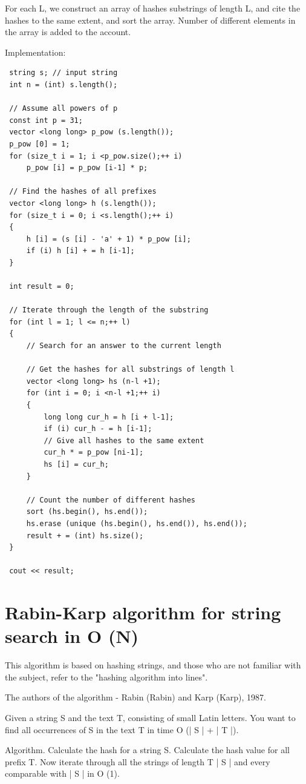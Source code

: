 For each L, we construct an array of hashes substrings of length L, and cite the hashes to the same extent, and sort the array. Number of different elements in the array is added to the account.

Implementation:
\begin{verbatim}
 string s; // input string
 int n = (int) s.length();

 // Assume all powers of p
 const int p = 31;
 vector <long long> p_pow (s.length());
 p_pow [0] = 1;
 for (size_t i = 1; i <p_pow.size();++ i)
     p_pow [i] = p_pow [i-1] * p;

 // Find the hashes of all prefixes
 vector <long long> h (s.length());
 for (size_t i = 0; i <s.length();++ i)
 {
     h [i] = (s [i] - 'a' + 1) * p_pow [i];
     if (i) h [i] + = h [i-1];
 }

 int result = 0;

 // Iterate through the length of the substring
 for (int l = 1; l <= n;++ l)
 {
     // Search for an answer to the current length

     // Get the hashes for all substrings of length l
     vector <long long> hs (n-l +1);
     for (int i = 0; i <n-l +1;++ i)
     {
         long long cur_h = h [i + l-1];
         if (i) cur_h - = h [i-1];
         // Give all hashes to the same extent
         cur_h * = p_pow [ni-1];
         hs [i] = cur_h;
     }

     // Count the number of different hashes
     sort (hs.begin(), hs.end());
     hs.erase (unique (hs.begin(), hs.end()), hs.end());
     result + = (int) hs.size();
 }

 cout << result; 
\end{verbatim}
\section{ Rabin-Karp algorithm for string search in O (N) }
This algorithm is based on hashing strings, and those who are not familiar with the subject, refer to the "hashing algorithm into lines".

The authors of the algorithm - Rabin (Rabin) and Karp (Karp), 1987.

Given a string S and the text T, consisting of small Latin letters. You want to find all occurrences of S in the text T in time O (| S | + | T |).

Algorithm. Calculate the hash for a string S. Calculate the hash value for all prefix T. Now iterate through all the strings of length T | S | and every comparable with | S | in O (1).


